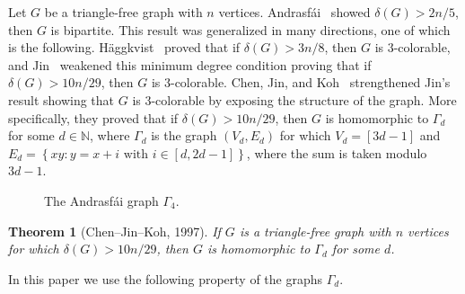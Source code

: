 \documentclass[a4paper,12pt]{article}
\newtheorem{theorem}{Theorem}
\newtheorem{proposition}[theorem]{Proposition}
\begin{document}
\newcommand{\andrasfai}{Andrasf\'ai}

Let \(G\) be a triangle-free graph with \(n\) vertices.
\andrasfai~\cite{andrasfal1964graphentheoretische} showed \(\delta(G) > 2n/5\),
then \(G\) is bipartite.
This result was generalized in many directions,
one of which is the following.
%
H{\"a}ggkvist~\cite{haggkvist1982odd} proved that if \(\delta(G) > 3n/8\), 
then \(G\) is \(3\)-colorable,
%
and Jin~\cite{jin1995triangle} weakened this minimum degree condition 
proving that if \(\delta(G) > 10n/29\), 
then \(G\) is \(3\)-colorable.
%
Chen, Jin, and Koh~\cite{chen1997triangle} strengthened Jin's result
showing that \(G\) is \(3\)-colorable by exposing the structure of the graph.
More specifically, they proved that if \(\delta(G) > 10n/29\),
then \(G\) is homomorphic to \(\Gamma_d\) for some \(d\in\mathbb{N}\),
where \(\Gamma_d\) is the graph \((V_d,E_d)\)
for which \(V_d = [3d-1]\) and \(E_d = \left\{xy : y = x + i \text{ with } i \in [d,2d-1]\right\}\),
where the sum is taken modulo \(3d-1\).

\begin{figure}[ht]
    \centering
        \centering
    \caption{The Andrasfái graph $\Gamma_4$.}
    \label{fig:andrasfai_graph}
\end{figure}

\begin{theorem}[Chen--Jin--Koh, 1997]\label{thm:ChenJinKoh}
	If \(G\) is a triangle-free graph with \(n\) vertices
	for which \(\delta(G) > 10n/29\),
	then \(G\) is homomorphic to \(\Gamma_d\) for some \(d\).
\end{theorem}

In this paper we use the following property of the graphs \(\Gamma_d\).

\end{document}
